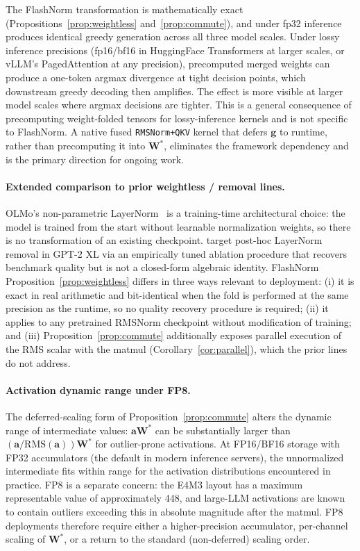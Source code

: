 \documentclass{article}
\begin{document}
The FlashNorm transformation is mathematically exact (Propositions~\ref{prop:weightless} and~\ref{prop:commute}), and under fp32 inference produces identical greedy generation across all three model scales. Under lossy inference precisions (fp16/bf16 in HuggingFace Transformers at larger scales, or vLLM's PagedAttention at any precision), precomputed merged weights can produce a one-token argmax divergence at tight decision points, which downstream greedy decoding then amplifies. The effect is more visible at larger model scales where argmax decisions are tighter. This is a general consequence of precomputing weight-folded tensors for lossy-inference kernels and is not specific to FlashNorm. A native fused \texttt{RMSNorm+QKV} kernel that defers $\mathbf{g}$ to runtime, rather than precomputing it into $\mathbf{W^\ast}$, eliminates the framework dependency and is the primary direction for ongoing work.

\paragraph{Extended comparison to prior weightless / removal lines.} OLMo's non-parametric LayerNorm~\citep{olmo2} is a training-time architectural choice: the model is trained from the start without learnable normalization weights, so there is no transformation of an existing checkpoint. \citet{remove-norm2} target post-hoc LayerNorm removal in GPT-2 XL via an empirically tuned ablation procedure that recovers benchmark quality but is not a closed-form algebraic identity. FlashNorm Proposition~\ref{prop:weightless} differs in three ways relevant to deployment: (i) it is exact in real arithmetic and bit-identical when the fold is performed at the same precision as the runtime, so no quality recovery procedure is required; (ii) it applies to any pretrained RMSNorm checkpoint without modification of training; and (iii) Proposition~\ref{prop:commute} additionally exposes parallel execution of the RMS scalar with the matmul (Corollary~\ref{cor:parallel}), which the prior lines do not address.

\paragraph{Activation dynamic range under FP8.} The deferred-scaling form of Proposition~\ref{prop:commute} alters the dynamic range of intermediate values: $\mathbf{a}\mathbf{W}^*$ can be substantially larger than $(\mathbf{a}/\mathrm{RMS}(\mathbf{a}))\mathbf{W}^*$ for outlier-prone activations. At FP16/BF16 storage with FP32 accumulators (the default in modern inference servers), the unnormalized intermediate fits within range for the activation distributions encountered in practice. FP8 is a separate concern: the E4M3 layout has a maximum representable value of approximately 448, and large-LLM activations are known to contain outliers exceeding this in absolute magnitude after the matmul. FP8 deployments therefore require either a higher-precision accumulator, per-channel scaling of $\mathbf{W}^*$, or a return to the standard (non-deferred) scaling order.
\end{document}
